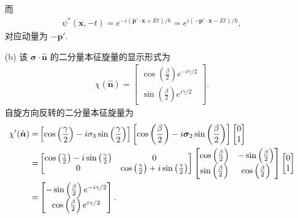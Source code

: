 \documentclass{assignment}
\begin{document}
\begin{pf}
\begin{itemize}
        而
        \begin{align}
            \psi^*(\bm{x},-t)=e^{-i(\bm{p}'\cdot\bm{x}+Et)/\hbar}=e^{i(-\bm{p}'\cdot\bm{x}-Et)/\hbar},
        \end{align}
        对应动量为 $-\bm{p}'$.
        \item[(b)] 该 $\bm{\sigma}\cdot\hat{\bm{n}}$ 的二分量本征旋量的显示形式为
        \begin{align}
            \chi(\hat{\bm{n}})=\begin{bmatrix}
                \cos\left(\frac{\beta}{2}\right)e^{-i\gamma/2}\\
                \sin\left(\frac{\beta}{2}\right)e^{i\gamma/2}
            \end{bmatrix}.
        \end{align}
        自旋方向反转的二分量本征旋量为
        \begin{align}
            \notag\chi'(\hat{\bm{n}})=&\left[\cos\left(\frac{\gamma}{2}\right)-i\sigma_3\sin\left(\frac{\gamma}{2}\right)\right]\left[\cos\left(\frac{\beta}{2}\right)-i\bm{\sigma}_2\sin\left(\frac{\beta}{2}\right)\right]\begin{bmatrix}
                0\\
                1
            \end{bmatrix}\\
            \notag=&\begin{bmatrix}
                \cos\left(\frac{\gamma}{2}\right)-i\sin\left(\frac{\gamma}{2}\right)&0\\
                0&\cos\left(\frac{\gamma}{2}\right)+i\sin\left(\frac{\gamma}{2}\right)
            \end{bmatrix}\begin{bmatrix}
                \cos\left(\frac{\beta}{2}\right)&-\sin\left(\frac{\beta}{2}\right)\\
                \sin\left(\frac{\beta}{2}\right)&\cos\left(\frac{\beta}{2}\right)
            \end{bmatrix}\begin{bmatrix}
                0\\
                1
            \end{bmatrix}\\
            =&\begin{bmatrix}
                -\sin\left(\frac{\beta}{2}\right)e^{-i\gamma/2}\\
                \cos\left(\frac{\beta}{2}\right)e^{i\gamma/2}
            \end{bmatrix}.

\end{align}
\end{itemize}
\end{pf}
\end{document}

